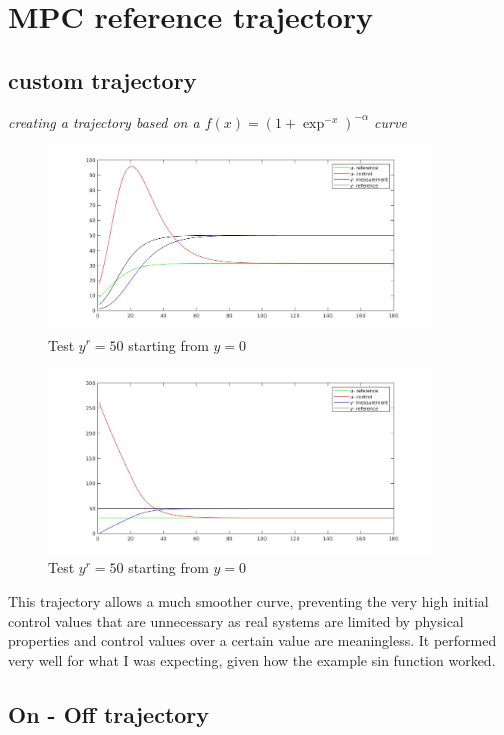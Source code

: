 \documentclass{article}
\begin{document}
\section{MPC reference trajectory}

\subsection{custom trajectory}
\textit{creating a trajectory based on a $f(x)=(1+\exp^{-x})^{-\alpha}$ curve}
\begin{figure}[H]
    \centering
    \includegraphics[width=0.9\textwidth]{mpc_trajectory.jpg}
    \caption{Test $y^r = 50$ starting from $y=0$}
    \label{fig:yr25}
\end{figure}
\begin{figure}[H]
    \centering
    \includegraphics[width=0.9\textwidth]{mpc_default.jpg}
    \caption{Test $y^r = 50$ starting from $y=0$}
    \label{fig:yr50}
\end{figure}
This trajectory allows a much smoother curve, preventing the very high initial control values that are unnecessary as real systems are limited by physical properties and control values over a certain value are meaningless. It performed very well for what I was expecting, given how the example sin function worked.

\subsection{On - Off trajectory}
\end{document}
